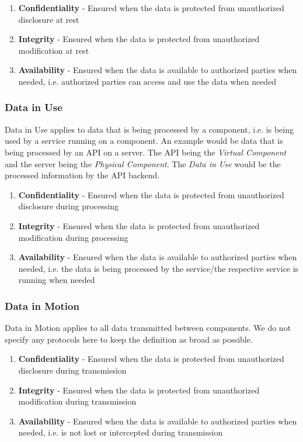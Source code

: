 \begin{enumerate}
\item \textbf{Confidentiality} - Ensured when the data is protected from unauthorized disclosure at rest
\item \textbf{Integrity} - Ensured when the data is protected from unauthorized modification at rest
\item \textbf{Availability} - Ensured when the data is available to authorized parties when needed, i.e. authorized parties can access and use the data when needed
\end{enumerate}

\subsubsection*{Data in Use}

Data in Use applies to data that is being processed by a component, i.e. is being used by a service running on a component. An example would be data that is being processed by an API on a server. The API being the \textit{Virtual Component} and the server being the \textit{Physical Component}. The \textit{Data in Use} would be the processed information by the API backend.

\begin{enumerate}
\item \textbf{Confidentiality} - Ensured when the data is protected from unauthorized disclosure during processing
\item \textbf{Integrity} - Ensured when the data is protected from unauthorized modification during processing
\item \textbf{Availability} - Ensured when the data is available to authorized parties when needed, i.e. the data is being processed by the service/the respective service is running when needed
\end{enumerate}

\subsubsection*{Data in Motion}

Data in Motion applies to all data transmitted between components. We do not specify any protocols here to keep the definition as broad as possible.

\begin{enumerate}
\item \textbf{Confidentiality} - Ensured when the data is protected from unauthorized disclosure during transmission
\item \textbf{Integrity} - Ensured when the data is protected from unauthorized modification during transmission
\item \textbf{Availability} - Ensured when the data is available to authorized parties when needed, i.e. is not lost or intercepted during transmission 
\end{enumerate}

